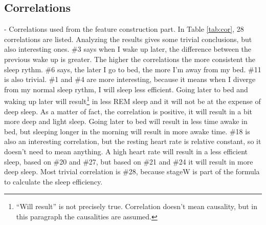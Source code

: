 	\subsection{Correlations}
	- Correlations used from the feature construction part. 
	In Table \ref{tab:cor}, 28 correlations are listed. Analyzing the results gives some trivial conclusions, but also interesting ones. \#3 says when I wake up later, the difference between the previous wake up is greater. The higher the correlations the more consistent the sleep rythm. \#6 says, the later I go to bed, the more I'm away from my bed. \#11 is also trivial. \#1 and \#4 are more interesting, because it means when I diverge from my normal sleep rythm, I will sleep less efficient. Going later to bed and waking up later will result\footnote{``Will result'' is not precisely true. Correlation doesn't mean causality, but in this paragraph the causalities are assumed.}  in less REM sleep and it will not be at the expense of deep sleep. As a matter of fact, the correlation is positive, it will result in a bit more deep and light sleep. Going later to bed will result in less time awake in bed, but sleeping longer in the morning will result in more awake time. \#18 is also an interesting correlation, but the resting heart rate is relative constant, so it doesn't need to mean anything. A high heart rate will result in a less efficient sleep, based on \#20 and \#27, but based on \#21 and \#24 it will result in more deep sleep. Most trivial correlation is \#28, because stageW is part of the formula to calculate the sleep efficiency.
		


